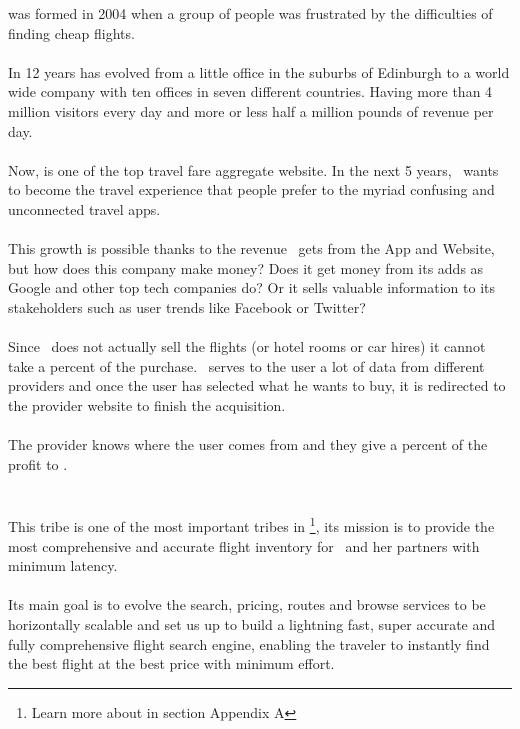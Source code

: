 \company\cite{skyscanner_strategy} was formed in 2004 when a group of people was frustrated by the difficulties of finding cheap flights.
\\\\
In 12 years has evolved from a little office in the suburbs of Edinburgh to a world wide company with ten offices in seven different countries. Having more than 4 million visitors every day and more or less half a million pounds of revenue per day.
\\\\
Now, is one of the top travel fare aggregate website. In the next 5 years, \company\ wants to become the travel experience that people prefer to the myriad confusing and unconnected travel apps.
\\\\
This growth is possible thanks to the revenue \company\ gets from the App and Website, but how does this company make money? Does it get money from its adds as Google and other top tech companies do? Or it sells valuable information to its stakeholders such as user trends like Facebook or Twitter?
\\\\
Since \company\ does not actually sell the flights (or hotel rooms or car hires) it cannot take a percent of the purchase. \company\ serves to the user a lot of data from different providers and once the user has selected what he wants to buy, it is redirected to the provider website to finish the acquisition.
\\\\
The provider knows where the user comes from and they give a percent of the profit to \company.


\section{\tribe}

This tribe\cite{marketplace_engine_home} is one of the most important tribes in \company\footnote{Learn more about \textit{} in section Appendix A}, its mission is to provide the most comprehensive and accurate flight inventory for \company\ and her partners with minimum latency.
\\\\
Its main goal is to evolve the search, pricing, routes and browse services to be horizontally scalable and set us up to build a lightning fast, super accurate and fully comprehensive flight search engine, enabling the traveler to instantly find the best flight at the best price with minimum effort.

